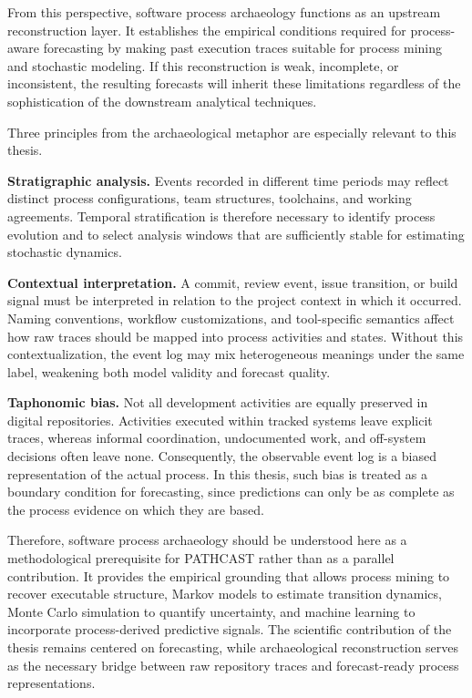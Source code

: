 From this perspective, software process archaeology functions as an upstream reconstruction layer. It establishes the empirical conditions required for process-aware forecasting by making past execution traces suitable for process mining and stochastic modeling. If this reconstruction is weak, incomplete, or inconsistent, the resulting forecasts will inherit these limitations regardless of the sophistication of the downstream analytical techniques.

Three principles from the archaeological metaphor are especially relevant to this thesis.

\textbf{Stratigraphic analysis.} Events recorded in different time periods may reflect distinct process configurations, team structures, toolchains, and working agreements. Temporal stratification is therefore necessary to identify process evolution and to select analysis windows that are sufficiently stable for estimating stochastic dynamics.

\textbf{Contextual interpretation.} A commit, review event, issue transition, or build signal must be interpreted in relation to the project context in which it occurred. Naming conventions, workflow customizations, and tool-specific semantics affect how raw traces should be mapped into process activities and states. Without this contextualization, the event log may mix heterogeneous meanings under the same label, weakening both model validity and forecast quality.

\textbf{Taphonomic bias.} Not all development activities are equally preserved in digital repositories. Activities executed within tracked systems leave explicit traces, whereas informal coordination, undocumented work, and off-system decisions often leave none. Consequently, the observable event log is a biased representation of the actual process. In this thesis, such bias is treated as a boundary condition for forecasting, since predictions can only be as complete as the process evidence on which they are based.

Therefore, software process archaeology should be understood here as a methodological prerequisite for PATHCAST rather than as a parallel contribution. It provides the empirical grounding that allows process mining to recover executable structure, Markov models to estimate transition dynamics, Monte Carlo simulation to quantify uncertainty, and machine learning to incorporate process-derived predictive signals. The scientific contribution of the thesis remains centered on forecasting, while archaeological reconstruction serves as the necessary bridge between raw repository traces and forecast-ready process representations.



